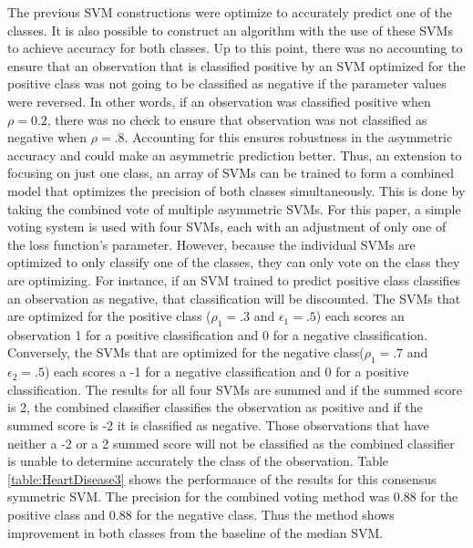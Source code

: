 The previous SVM constructions were optimize to accurately predict one of the classes. It is also possible to construct an algorithm with the use of these SVMs to achieve accuracy for both classes. Up to this point, there was no accounting to ensure that an observation that is classified positive by an SVM optimized for the positive class was not going to be classified as negative if the parameter values were reversed. In other words, if an observation was classified positive when $\rho=0.2$, there was no check to ensure that observation was not classified as negative when $\rho=.8$. Accounting for this ensures robustness in the asymmetric accuracy and could make an asymmetric prediction better. Thus, an extension to focusing on just one class, an array of SVMs can be trained to form a combined model that optimizes the precision of both classes simultaneously. This is done by taking the combined vote of multiple asymmetric SVMs. For this paper, a simple voting system is used with four SVMs, each with an adjustment of only one of the loss function's parameter. However, because the individual SVMs are optimized to only classify one of the classes, they can only vote on the class they are optimizing. For instance, if an SVM trained to predict positive class classifies an observation as negative, that classification will be discounted. The SVMs that are optimized for the positive class ($\rho_1=.3$ and $\epsilon_1=.5$) each scores an observation 1 for a positive classification and 0 for a negative classification. Conversely, the SVMs that are optimized for the negative class($\rho_1=.7$ and $\epsilon_2=.5$) each scores a -1 for a negative classification and 0 for a positive classification. The results for all four SVMs are summed and if the summed score is 2, the combined classifier classifies the observation as positive and if the summed score is -2 it is classified as negative. Those observations that have neither a -2 or a 2 summed score will not be classified as the combined classifier is unable to determine accurately the class of the observation. Table \ref{table:HeartDisease3} shows the performance of the results for this consensus symmetric SVM. The precision for the combined voting method was 0.88 for the positive class and 0.88 for the negative class. Thus the method shows improvement in both classes from the baseline of the median SVM.

